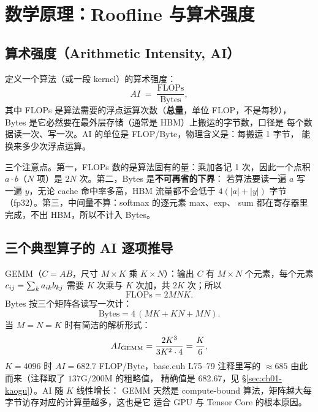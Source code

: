 \section{数学原理：Roofline 与算术强度}\label{sec:ch01-math}

\subsection{算术强度（Arithmetic Intensity, AI）}

定义一个算法（或一段 kernel）的算术强度：
\begin{equation}
  AI \;=\; \frac{\mathrm{FLOPs}}{\mathrm{Bytes}},
  \label{eq:ch01-ai}
\end{equation}
其中 FLOPs 是算法需要的浮点运算次数（\textbf{总量}，单位 FLOP，不是每秒），
Bytes 是它必然要在最外层存储（通常是 HBM）上搬运的字节数，口径是
每个数据读一次、写一次。AI 的单位是 FLOP/Byte，物理含义是：每搬运 1 字节，
能换来多少次浮点运算。

三个注意点。第一，FLOPs 数的是算法固有的量：乘加各记 1 次，因此一个点积
$a\cdot b$（$N$ 项）是 $2N$ 次。第二，Bytes 是\textbf{不可再省的下界}：
若算法要读一遍 $a$ 写一遍 $y$，无论 cache 命中率多高，HBM 流量都不会低于
$4(|a|+|y|)$ 字节（fp32）。第三，中间量不算：softmax 的逐元素 max、exp、
sum 都在寄存器里完成，不出 HBM，所以不计入 Bytes。

\subsection{三个典型算子的 AI 逐项推导}

GEMM（$C = AB$，尺寸 $M{\times}K$ 乘 $K{\times}N$）：输出 $C$ 有
$M \times N$ 个元素，每个元素 $c\sb{ij} = \sum\sb{k} a\sb{ik} b\sb{kj}$ 需要
$K$ 次乘与 $K$ 次加，共 $2K$ 次；所以
\begin{equation}
  \mathrm{FLOPs} = 2MNK .
\end{equation}
Bytes 按三个矩阵各读写一次计：
\begin{equation}
  \mathrm{Bytes} = 4\,(MK + KN + MN).
\end{equation}
当 $M = N = K$ 时有简洁的解析形式：
\begin{equation}
  AI\sb{\mathrm{GEMM}} = \frac{2K^3}{3K^2 \cdot 4} = \frac{K}{6},
  \label{eq:ch01-gemm-ai}
\end{equation}
$K = 4096$ 时 $AI = 682.7$ FLOP/Byte，base.cuh L75--79 注释里写的
$\approx 685$ 由此而来（注释取了 $137\mathrm{G}/200\mathrm{M}$ 的粗略值，
精确值是 682.67，见 \S\ref{sec:ch01-kaogu}）。AI 随 $K$ 线性增长：
GEMM 天然是 compute-bound 算法，矩阵越大每字节访存对应的计算量越多，这也是它
适合 GPU 与 Tensor Core 的根本原因。

